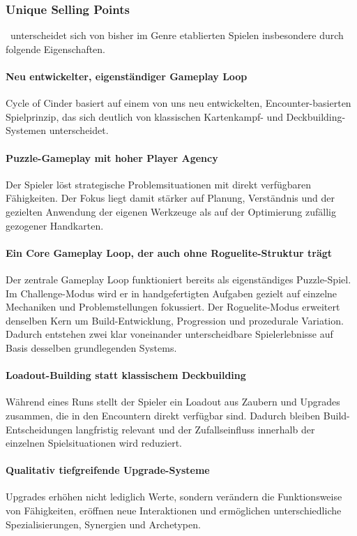 \subsubsection{Unique Selling Points}

\coc\ unterscheidet sich von bisher im Genre etablierten Spielen insbesondere durch folgende Eigenschaften.

\paragraph{Neu entwickelter, eigenständiger Gameplay Loop}
Cycle of Cinder basiert auf einem von uns neu entwickelten, Encounter-basierten Spielprinzip, das sich deutlich von klassischen Kartenkampf- und Deckbuilding-Systemen unterscheidet.

\paragraph{Puzzle-Gameplay mit hoher Player Agency}
Der Spieler löst strategische Problemsituationen mit direkt verfügbaren Fähigkeiten. Der Fokus liegt damit stärker auf Planung, Verständnis und der gezielten Anwendung der eigenen Werkzeuge als auf der Optimierung zufällig gezogener Handkarten.

\paragraph{Ein Core Gameplay Loop, der auch ohne Roguelite-Struktur trägt}
Der zentrale Gameplay Loop funktioniert bereits als eigenständiges Puzzle-Spiel. Im Challenge-Modus wird er in handgefertigten Aufgaben gezielt auf einzelne Mechaniken und Problemstellungen fokussiert. Der Roguelite-Modus erweitert denselben Kern um Build-Entwicklung, Progression und prozedurale Variation. Dadurch entstehen zwei klar voneinander unterscheidbare Spielerlebnisse auf Basis desselben grundlegenden Systems.

\paragraph{Loadout-Building statt klassischem Deckbuilding}
Während eines Runs stellt der Spieler ein Loadout aus Zaubern und Upgrades zusammen, die in den Encountern direkt verfügbar sind. Dadurch bleiben Build-Entscheidungen langfristig relevant und der Zufallseinfluss innerhalb der einzelnen Spielsituationen wird reduziert.

\paragraph{Qualitativ tiefgreifende Upgrade-Systeme}
Upgrades erhöhen nicht lediglich Werte, sondern verändern die Funktionsweise von Fähigkeiten, eröffnen neue Interaktionen und ermöglichen unterschiedliche Spezialisierungen, Synergien und Archetypen.

